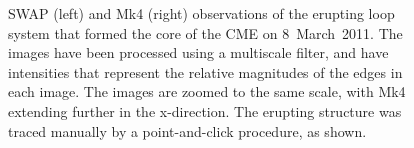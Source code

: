 \documentclass[namedreferences]{solarphysics}
\begin{document}
\begin{article}
\begin{figure}[p]
\caption{SWAP (left) and Mk4 (right) observations of the erupting loop system that formed the core of the CME on 8~March~2011. The images have been processed using a multiscale filter, and have intensities that represent the relative magnitudes of the edges in each image. The images are zoomed to the same scale, with Mk4 extending further in the x-direction. The erupting structure was traced manually by a point-and-click procedure, as shown.}
\label{combined_modgrad_points}
\end{figure}


\end{article}
\end{document}
